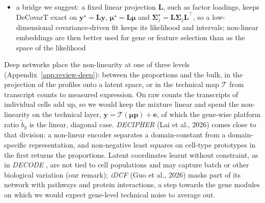 \documentclass[pdflatex, sn-nature]{sn-jnl}
\theoremstyle{thmstyleone}%
\theoremstyle{thmstyletwo}%
\theoremstyle{thmstylethree}%
\begin{document}
\begin{itemize}
\begin{itemize}
          enrichment is an indirect check
    \item the linear relationship between bulk and single-cell expression breaks: for a non-linear map
          \(f\), \(f(\sum_{j}p_{j}\boldsymbol{x}_{\cdot j})\neq\sum_{j}p_{j}f(\boldsymbol{x}_{\cdot j})\), so the proportions are no longer
          the parameters of a generative model; \emph{DECONVersation} checks additivity only by a cosine
          similarity that anisotropy inflates, and bulk samples are out of distribution for models trained on
          single cells
    \item inference: without a likelihood there is no finite-sample or asymptotic interval for
          \(\boldsymbol{p}\), no boundary test for an absent type, and no marginal effect of explanatory covariates
          (Section~\ref{sec:generalized-linear-model}); resampling remains, at a high computational cost
    \item cost and variability: fine-tuning needs a GPU, and results change with the chosen model
  \end{itemize}
  \item a bridge we suggest: a fixed linear projection \(\boldsymbol{L}\), such as factor loadings, keeps DeCovarT exact
        on \(\boldsymbol{y}^{\star}=\boldsymbol{L}\boldsymbol{y}\), \(\boldsymbol{\mu}^{\star}=\boldsymbol{L}\boldsymbol{\mu}\) and
        \(\boldsymbol{\Sigma}_{j}^{\star}=\boldsymbol{L}\boldsymbol{\Sigma}_{j}\boldsymbol{L}^{\top}\), so a low-dimensional covariance-driven fit keeps its
        likelihood and intervals; non-linear embeddings are then better used for gene or feature selection
        than as the space of the likelihood
\end{itemize}

Deep networks place the non-linearity at one of three levels (Appendix~\ref{app:review-deep}): between the
proportions and the bulk, in the projection of the profiles onto a latent space, or in the technical map
\(\mathcal{T}\) from transcript counts to measured expression.
On raw counts the transcripts of individual cells add up, so we would keep the mixture linear and spend the
non-linearity on the technical layer, \(\boldsymbol{y}=\mathcal{T}(\boldsymbol{\mu}\boldsymbol{p})+\boldsymbol{e}\), of which the gene-wise
platform ratio \(\tilde b_{g}\) is the linear, diagonal case.
\emph{DECIPHER} (Lai et al., 2026) comes close to that division: a non-linear encoder separates a domain-constant from a
domain-specific representation, and non-negative least squares on cell-type prototypes in the first returns the
proportions.
Latent coordinates learnt without constraint, as in \emph{DECODE} \cite{zhaoDecodeDeepLearningBased2026}, are
not tied to cell populations and may capture batch or other biological variation (our remark); \emph{iDCF} (Guo et al., 2026) masks part of its network with pathways and
protein interactions, a step towards the gene modules on which we would expect gene-level technical noise to
average out.
\end{document}
